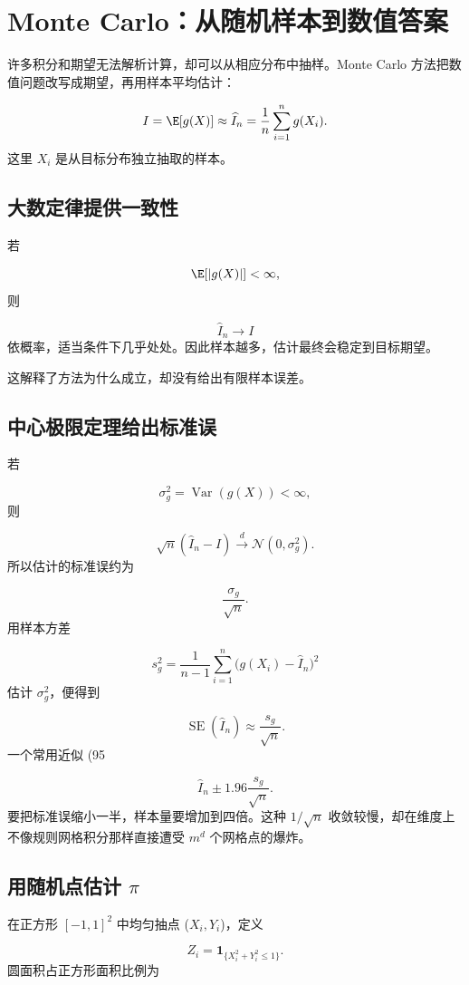 \section{Monte Carlo：从随机样本到数值答案}

许多积分和期望无法解析计算，却可以从相应分布中抽样。Monte Carlo 方法把数值问题改写成期望，再用样本平均估计：

\[
I=\E[g(X)]
\approx
\widehat I_n
=\frac1n\sum_{i=1}^{n}g(X_i).
\]
这里 $X_i$ 是从目标分布独立抽取的样本。

\subsection{大数定律提供一致性}

若

\[
\E[|g(X)|]<\infty,
\]
则

\[
\widehat I_n\to I
\]
依概率，适当条件下几乎处处。因此样本越多，估计最终会稳定到目标期望。

这解释了方法为什么成立，却没有给出有限样本误差。

\subsection{中心极限定理给出标准误}

若

\[
\sigma_g^2=\operatorname{Var}(g(X))<\infty,
\]
则

\[
\sqrt n(\widehat I_n-I)
\xrightarrow{d}
\mathcal N(0,\sigma_g^2).
\]
所以估计的标准误约为

\[
\frac{\sigma_g}{\sqrt n}.
\]
用样本方差

\[
s_g^2
=\frac1{n-1}\sum_{i=1}^{n}
\bigl(g(X_i)-\widehat I_n\bigr)^2
\]
估计 $\sigma_g^2$，便得到

\[
\operatorname{SE}(\widehat I_n)
\approx\frac{s_g}{\sqrt n}.
\]
一个常用近似 (95%

\[
\widehat I_n
\pm1.96\frac{s_g}{\sqrt n}.
\]
要把标准误缩小一半，样本量要增加到四倍。这种 $1/\sqrt n$ 收敛较慢，却在维度上不像规则网格积分那样直接遭受 $m^d$ 个网格点的爆炸。

\subsection{用随机点估计 $\pi$}

在正方形 $[-1,1]^2$ 中均匀抽点 ($X_i,Y_i$)，定义

\[
Z_i=\mathbf1_{\{X_i^2+Y_i^2\le1\}}.
\]
圆面积占正方形面积比例为

